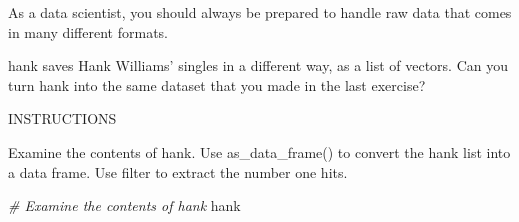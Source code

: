 \documentclass[]{article}
\newenvironment{Shaded}{\begin{snugshade}}{\end{snugshade}}
\newcommand{\CommentTok}[1]{\textcolor[rgb]{0.56,0.35,0.01}{\textit{#1}}}
\newcommand{\NormalTok}[1]{#1}
\begin{document}
As a data scientist, you should always be prepared to handle raw data
that comes in many different formats.

hank saves Hank Williams' singles in a different way, as a list of
vectors. Can you turn hank into the same dataset that you made in the
last exercise?

INSTRUCTIONS

Examine the contents of hank. Use as\_data\_frame() to convert the hank
list into a data frame. Use filter to extract the number one hits.

\begin{Shaded}
\begin{Highlighting}[]
\CommentTok{# Examine the contents of hank}
\NormalTok{hank}
\end{Highlighting}
\end{Shaded}
\end{document}

